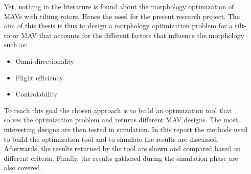 Yet, nothing in the literature is found about the morphology optimization
of MAVs with tilting rotors. Hence the need for the present research project.
The aim of this thesis is thus to design a morphology optimization problem for
a tilt-rotor MAV that accounts for the different factors that influence the
morphology such as:

\begin{itemize}
\item Omni-directionality
\item Flight efficiency
\item Controlability
\end{itemize}

To reach this goal the chosen approach is to build an optimization tool that solves
the optimization problem and returns different MAV designs. The most interesting
designs are then tested in simulation.
In this report the methods used to build the optimization tool and to simulate
the results are discussed. Afterwards, the results returned by the tool are shown
and compared based on different criteria. Finally, the results gathered during
the simulation phase are also covered.
